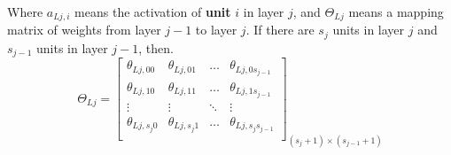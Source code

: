 \begin{itemize}
    Where $a_{Lj,i}$ means the activation of \textbf{unit} $i$ in layer $j$, and $\Theta_{Lj}$ means a mapping matrix of weights from layer $j-1$ to layer $j$.
    If there are $s_j$ units in layer $j$ and $s_{j-1}$ units in layer $j-1$, then.
    \begin{equation}
        \Theta_{Lj} =
        \left[
        \begin{matrix}
            \theta_{Lj, 00}     & \theta_{Lj, 01}     & \dots   & \theta_{Lj, 0{s_{j-1}}}     \\
            \theta_{Lj, 10}     & \theta_{Lj, 11}     & \dots   & \theta_{Lj, 1{s_{j-1}}}     \\
            \vdots              & \vdots              & \ddots  & \vdots                      \\
            \theta_{Lj, {s_j}0} & \theta_{Lj, {s_j}1} & \dots   & \theta_{Lj, {s_j}{s_{j-1}}} \\
        \end{matrix}
        \right]_{{(s_j+1)} \times {(s_{j-1}+1)}}
    \end{equation}
\end{itemize}

    
